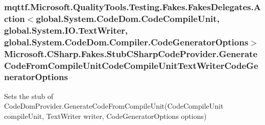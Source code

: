 \hypertarget{class_microsoft_1_1_c_sharp_1_1_fakes_1_1_stub_c_sharp_code_provider_aca9668f5733629745589a8e850d9cd43}{
\subsubsection[{Generate\-Code\-From\-Compile\-Unit\-Code\-Compile\-Unit\-Text\-Writer\-Code\-Generator\-Options}]{\setlength{\rightskip}{0pt plus 5cm}mqttf.\-Microsoft.\-Quality\-Tools.\-Testing.\-Fakes.\-Fakes\-Delegates.\-Action$<$global.\-System.\-Code\-Dom.\-Code\-Compile\-Unit, global.\-System.\-I\-O.\-Text\-Writer, global.\-System.\-Code\-Dom.\-Compiler.\-Code\-Generator\-Options$>$ Microsoft.\-C\-Sharp.\-Fakes.\-Stub\-C\-Sharp\-Code\-Provider.\-Generate\-Code\-From\-Compile\-Unit\-Code\-Compile\-Unit\-Text\-Writer\-Code\-Generator\-Options}}\label{class_microsoft_1_1_c_sharp_1_1_fakes_1_1_stub_c_sharp_code_provider_aca9668f5733629745589a8e850d9cd43}


Sets the stub of Code\-Dom\-Provider.\-Generate\-Code\-From\-Compile\-Unit(\-Code\-Compile\-Unit compile\-Unit, Text\-Writer writer, Code\-Generator\-Options options)

